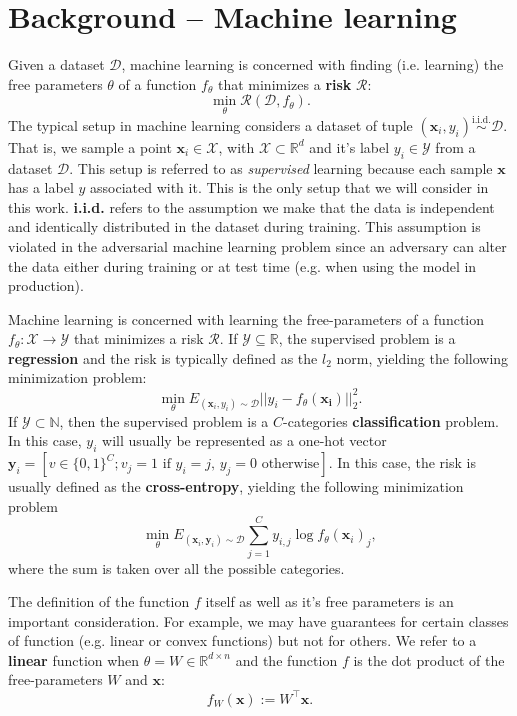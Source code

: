 \section{Background -- Machine learning}
\label{sec-background}
Given a dataset $\mathcal{D}$, machine learning is concerned with finding (i.e. learning) the free parameters $\theta$ of a function $f_\theta$ that minimizes a \textbf{risk} $\mathcal{R}$:
\[
\min_\theta \mathcal{R}(\mathcal{D}, f_\theta).
\]
The typical setup in machine learning considers a dataset of tuple $(\bm x_i, y_i)\stackrel{\text{i.i.d.}}{\sim} \mathcal{D}$. That is, we sample a point $\bm x_i\in\mathcal{X}$, with $\mathcal{X}\subset\mathbb{R}^d$ and it's label $y_i\in\mathcal{Y}$ from a dataset $\mathcal{D}$. This setup is referred to as \textit{supervised} learning because each sample $\bm x$ has a label $y$ associated with it. This is the only setup that we will consider in this work. \textbf{i.i.d.} refers to the assumption we make that the data is independent and identically distributed in the dataset during training. This assumption is violated in the adversarial machine learning problem since an adversary can alter the data either during training or at test time (e.g. when using the model in production).

Machine learning is concerned with learning the free-parameters of a function $f_\theta:\mathcal X\to \mathcal Y$ that minimizes a risk $\mathcal{R}$. If $\mathcal{Y}\subseteq\mathbb{R}$, the supervised problem is a \textbf{regression} and the risk is typically defined as the $l_2$ norm, yielding the following minimization problem:
\[
\min_\theta E_{(\bm x_i, y_i)\sim\mathcal{D}}||y_i - f_\theta(\bm{x_i})||^2_2.
\]
If $\mathcal Y\subset\mathbb{N}$, then the supervised problem is a $C$-categories \textbf{classification} problem. In this case, $y_i$ will usually be represented as a one-hot vector $\bm y_i=[v\in\{0, 1\}^{C}; v_j=1\text{ if } y_i=j\text{, } y_j=0\text{ otherwise}]$. In this case, the risk is usually defined as the \textbf{cross-entropy}, yielding the following minimization problem
\[
\min_\theta E_{(\bm x_i, \bm y_i)\sim\mathcal{D}}\sum_{j=1}^C y_{i,j}\log f_\theta(\bm x_i)_j,
\]
where the sum is taken over all the possible categories.

The definition of the function $f$ itself as well as it's free parameters is an important consideration. For example, we may have guarantees for certain classes of function (e.g. linear or convex functions) but not for others. We refer to a \textbf{linear} function when $\theta=W\in\mathbb{R}^{d\times n}$ and the function $f$ is the dot product of the free-parameters $W$ and $\bm x$: 
\[f_W(\bm x):= W^\top\bm x.\]

